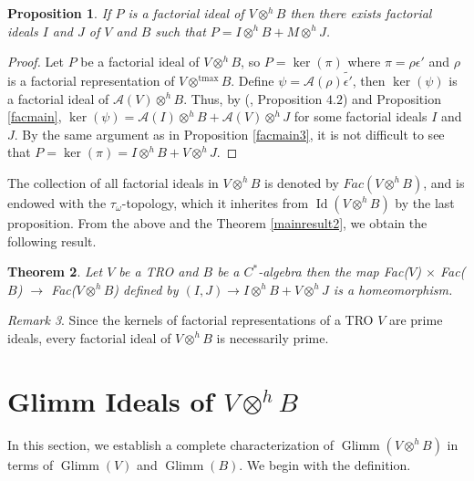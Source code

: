 \documentclass{birkjour}
\newtheorem{thm}{Theorem}[section]
\newtheorem{prop}[thm]{Proposition}
\theoremstyle{definition}
\theoremstyle{remark}
\newtheorem{rem}[thm]{Remark}
\numberwithin{equation}{section}
\begin{document}
\begin{prop}\label{facmain1}
     If $P$ is a factorial ideal of $V \otimes^h B$ then there exists factorial ideals $I$ and $J$ of $V$ and $B$ such that $P=I \otimes^h B+ M \otimes^h J$.
\end{prop}

\begin{proof}
    Let $P$ be a factorial ideal of $V \otimes^h B$, so $P= \operatorname{ker}(\pi)$ where $\pi=\rho \epsilon'$ and $\rho$ is a factorial representation of $V \otimes^{\text{tmax}} B$. Define $\psi= \mathcal{A}(\rho) \tilde{\epsilon'}$, then  $\operatorname{ker}(\psi)$ is a factorial ideal of $\mathcal{A}(V) \otimes^h B$. Thus, by (\cite{AR}, Proposition $4.2$) and Proposition \ref{facmain}, $\operatorname{ker}(\psi)= \mathcal{A}(I) \otimes^h B + \mathcal{A}(V) \otimes^h J$ for some factorial ideals $I$ and $J$. By the same argument as in Proposition \ref{facmain3}, it is not difficult to see that $P=\operatorname{ker}(\pi)= I \otimes^h B + V \otimes^h J$.
\end{proof}

The collection of all factorial ideals in $V \otimes^h B$ is denoted by $Fac(V \otimes^h B)$, and is endowed with the $\tau_\omega$-topology, which  it inherites from 
$\operatorname{Id}(V \otimes^h B)$ by the last proposition. From the above and the Theorem \ref{mainresult2}, we obtain the following result.
 


\begin{thm}
    Let $V$ be a TRO and $B$ be a $C^{\ast}$-algebra then the map Fac($V$) $\times$ Fac($B$) $\to$ Fac($V \otimes^h B$) defined by $(I, J) \to I \otimes^h B + V \otimes^h J$ is a homeomorphism. 
\end{thm}

\begin{rem}
    Since the kernels of factorial representations of a TRO $V$ are prime ideals,  every factorial ideal of $V \otimes^h B$ is necessarily prime.
\end{rem}





 \section{Glimm Ideals of $V \otimes^h B$}

In this section, we establish a complete characterization of \(\operatorname{Glimm}(V \otimes^h B)\) in terms of \(\operatorname{Glimm}(V)\) and \(\operatorname{Glimm}(B)\). We begin with the definition.
\end{document}
